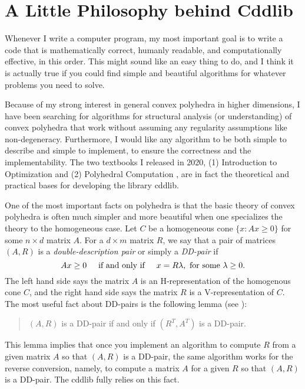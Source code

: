 \documentclass[11pt]{article}
\newcommand {\0} {{\bf 0}}
\begin{document}
\section{A Little Philosophy behind Cddlib}  \label{PHILOSOPHY}

Whenever I write a computer program, my most important goal is
to write a code that is mathematically correct, humanly readable, and
computationally effective,
in this order.  This might sound like an easy thing to do, and I think it is actually true if you could
find simple and beautiful algorithms for whatever problems you need to solve.

Because of my strong interest in general convex polyhedra
in higher dimensions, I have been searching for algorithms for 
structural analysis (or understanding) of convex polyhedra that
work without assuming any regularity assumptions like non-degeneracy.  
Furthermore, I would like any algorithm to be both simple to describe 
and simple to implement, to ensure the correctness and the implementability.
The two textbooks I released in 2020,
(1) Introduction to Optimization \cite{f-io-20} and 
(2) Polyhedral Computation \cite{f-pc-20}, are in fact the theoretical and practical bases
for developing the library cddlib.

One of the most important facts on polyhedra is that the basic theory of
convex polyhedra is often much simpler and more beautiful when one specializes 
the theory to the homogeneous case.    
Let $C$ be a homogeneous cone 
$\{x : A x \ge 0\}$ for some $n\times d$ matrix $A$.  For a $d\times m$ matrix $R$, 
we say that a pair of matrices $(A, R)$  is a {\em double-description pair\/} or 
simply a {\em DD-pair\/} if
\[
  A x \ge 0 \hspace{5mm} \mbox{if and only if} \hspace{5mm} x = R \lambda,  
  \mbox{ for some }\lambda \ge 0 .
  \]
 The left hand side says the matrix $A$ is an H-representation of the homogenous cone $C$,
 and the right hand side says the matrix $R$ is a V-representation of $C$.  The most useful fact
 about DD-pairs is the following lemma (see \cite[Section 2.5]{f-pc-20}):
 \begin{quote}
   $(A, R)$ is a DD-pair \hspace{3mm}  if and only if \hspace{3mm}  $(R^T, A^T)$ is a DD-pair.
 \end{quote}
This lemma implies that once you implement an algorithm to
 compute $R$ from a given matrix $A$ so that $(A, R)$ is a DD-pair, 
 the same algorithm works for the reverse conversion, namely, to compute a matrix $A$ for a given $R$
 so that $(A, R)$ is a DD-pair.  The cddlib fully relies on this fact.
 
\end{document}
